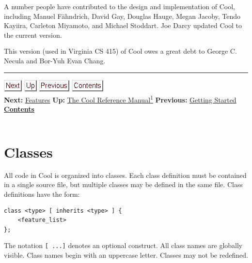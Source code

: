 \documentclass[]{article}
\begin{document}
A number people have contributed to the design and implementation of
Cool, including Manuel Fähndrich, David Gay, Douglas Hauge, Megan
Jacoby, Tendo Kayiira, Carleton Miyamoto, and Michael Stoddart. Joe
Darcy updated Cool to the current version.

This version (used in Virginia CS 415) of Cool owes a great debt to
George C. Necula and Bor-Yuh Evan Chang.

\begin{center}\rule{3in}{0.4pt}\end{center}

\href{node5.html}{\includegraphics{next.png}}
\href{cool-manual.html}{\includegraphics{up.png}}
\href{node3.html}{\includegraphics{prev.png}}
\href{node1.html}{\includegraphics{contents.png}} \\ \textbf{Next:}
\href{node5.html}{Features} \textbf{Up:} \href{cool-manual.html}{The
Cool Reference Manual\textsuperscript{1}} \textbf{Previous:}
\href{node3.html}{Getting Started} ~
\textbf{\href{node1.html}{Contents}} \\ \\

\section{Classes}

All code in Cool is organized into classes. Each class definition must
be contained in a single source file, but multiple classes may be
defined in the same file. Class definitions have the form:

\begin{verbatim}
class <type> [ inherits <type> ] {
    <feature_list>
};
\end{verbatim}

The notation \texttt{{[} ...{]}} denotes an optional construct. All
class names are globally visible. Class names begin with an uppercase
letter. Classes may not be redefined.
\end{document}
